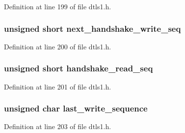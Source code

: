 Definition at line 199 of file dtls1.\+h.

\subsubsection[{\texorpdfstring{next\+\_\+handshake\+\_\+write\+\_\+seq}{next_handshake_write_seq}}]{\setlength{\rightskip}{0pt plus 5cm}unsigned short next\+\_\+handshake\+\_\+write\+\_\+seq}\hypertarget{structdtls1__state__st_a0a3aef30ca9552d12dc99252dcbc7a9b}{}\label{structdtls1__state__st_a0a3aef30ca9552d12dc99252dcbc7a9b}


Definition at line 200 of file dtls1.\+h.

\subsubsection[{\texorpdfstring{handshake\+\_\+read\+\_\+seq}{handshake_read_seq}}]{\setlength{\rightskip}{0pt plus 5cm}unsigned short handshake\+\_\+read\+\_\+seq}\hypertarget{structdtls1__state__st_a2626ecf26d6b86fb75980b2c5dda4dc0}{}\label{structdtls1__state__st_a2626ecf26d6b86fb75980b2c5dda4dc0}


Definition at line 201 of file dtls1.\+h.

\subsubsection[{\texorpdfstring{last\+\_\+write\+\_\+sequence}{last_write_sequence}}]{\setlength{\rightskip}{0pt plus 5cm}unsigned char last\+\_\+write\+\_\+sequence}\hypertarget{structdtls1__state__st_a8ed568b8fe49df93598b4dcb39ee4c3f}{}\label{structdtls1__state__st_a8ed568b8fe49df93598b4dcb39ee4c3f}


Definition at line 203 of file dtls1.\+h.

